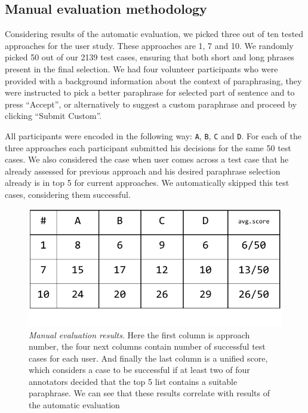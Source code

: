 \subsection{Manual evaluation methodology}

Considering results of the automatic evaluation, we picked three out of ten tested approaches for the user study. These approaches are 1, 7 and 10. We randomly picked 50 out of our 2139 test cases, ensuring that both short and long phrases present in the final selection. We had four volunteer participants who were provided with a background information about the context of paraphrasing, they were instructed to pick a better paraphrase for selected part of sentence and to press ``Accept'', or alternatively to suggest a custom paraphrase and proceed by clicking ``Submit Custom''. 

All participants were encoded in the following way: \texttt{A}, \texttt{B}, \texttt{C} and \texttt{D}. For each of the three approaches each participant submitted his decisions for the same 50 test cases. We also considered the case when user comes across a test case that he already assessed for previous approach and his desired paraphrase selection already is in top 5 for current approaches. We automatically skipped this test cases, considering them successful. 

\begin{figure}
 \centering 
 \includegraphics[scale=0.8]{g/man-eval-result.pdf}
 \caption{\emph{Manual evaluation results}. Here the first column is approach number, the four next columns contain number of successful test cases for each user. And finally the last column is a unified score, which considers a case to be successful if at least two of four annotators decided that the top 5 list contains a suitable paraphrase. We can see that these results correlate with results of the automatic evaluation}
\end{figure}

